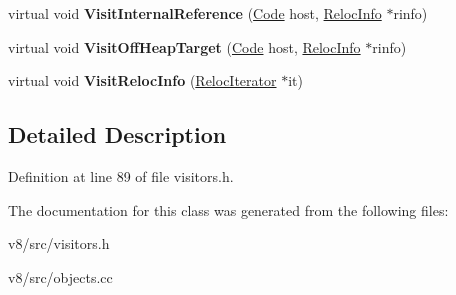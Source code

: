 \begin{DoxyCompactItemize}
virtual void {\bfseries Visit\+Internal\+Reference} (\mbox{\hyperlink{classv8_1_1internal_1_1Code}{Code}} host, \mbox{\hyperlink{classv8_1_1internal_1_1RelocInfo}{Reloc\+Info}} $\ast$rinfo)
\item 
\mbox{\label{classv8_1_1internal_1_1ObjectVisitor_a8c03a16026c3194c2916d61d8fee2d91}} 
virtual void {\bfseries Visit\+Off\+Heap\+Target} (\mbox{\hyperlink{classv8_1_1internal_1_1Code}{Code}} host, \mbox{\hyperlink{classv8_1_1internal_1_1RelocInfo}{Reloc\+Info}} $\ast$rinfo)
\item 
\mbox{\label{classv8_1_1internal_1_1ObjectVisitor_a72942d13ffd736c15ad241b7851f59c2}} 
virtual void {\bfseries Visit\+Reloc\+Info} (\mbox{\hyperlink{classv8_1_1internal_1_1RelocIterator}{Reloc\+Iterator}} $\ast$it)
\end{DoxyCompactItemize}


\subsection{Detailed Description}


Definition at line 89 of file visitors.\+h.



The documentation for this class was generated from the following files\+:\begin{DoxyCompactItemize}
\item 
v8/src/visitors.\+h\item 
v8/src/objects.\+cc\end{DoxyCompactItemize}
